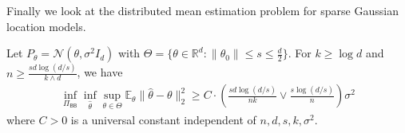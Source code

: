 \documentclass[final,12pt]{colt2018} %
\def \bE {\mathbb{E}}
\def \bR {\mathbb{R}}
\newcommand{\calN}{{\mathcal{N}}}
\begin{document}
%	


Finally we look at the distributed mean estimation problem for sparse Gaussian location models. 
\begin{theorem}\label{thm.sparse}
	Let $P_{\theta}=\calN(\theta,\sigma^2I_d)$ with $\Theta= \{\theta\in \bR^d:\|\theta_0\|\le s\le \frac{d}{2}\}$. For $k\ge \log d$ and $n\ge \frac{sd\log(d/s)}{k\wedge d}$, we have
	\begin{align*}
	\inf_{\Pi_{\mathsf{BB}}} \inf_{\hat{\theta}}\sup_{\theta\in\Theta} \bE_{\theta}\|\hat{\theta}-\theta\|_2^2 \ge C\cdot \left(\frac{sd\log(d/s)}{nk} \vee \frac{s\log(d/s)}{n}\right)\sigma^2
	\end{align*}
	where $C>0$ is a universal constant independent of $n,d,s,k,\sigma^2$.
\end{theorem}
\end{document}
